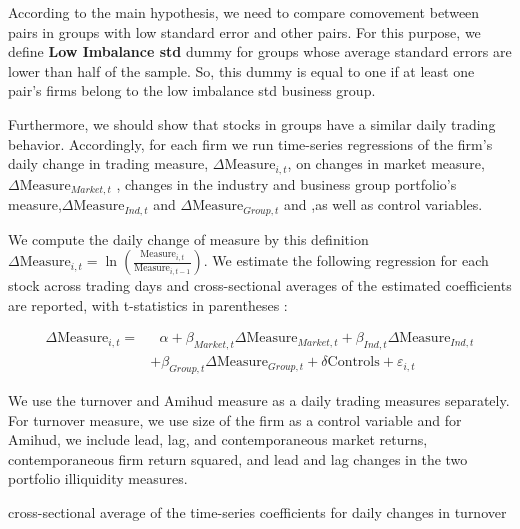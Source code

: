\documentclass[12pt, a4paper]{article}
\begin{document}
According to the main hypothesis, we need to compare comovement between pairs in groups with low standard error and other pairs.
For this purpose, we define \textbf{Low Imbalance std} dummy for groups whose average standard errors are lower than half of the sample. 
So, this dummy is equal to one if at least one pair's firms belong to the low imbalance std business group.
\begin{table}[htbp]
	\centering
	\resizebox{\textwidth}{!}{
		
	}
\end{table}
\FloatBarrier

Furthermore, we should show that stocks in groups have a similar daily trading behavior. Accordingly, for each firm we run time-series regressions of the firm's daily change in trading measure, $ \Delta \text{Measure}_{i,t} $, on changes in market measure,$ \Delta\text{Measure}_{Market,t}   $ , changes in the industry and business group portfolio's measure,$ \Delta\text{Measure}_{Ind,t} $ and  $\Delta \text{Measure}_{Group,t} $ and  ,as well as control variables.

We compute the daily change of measure by this definition $ \Delta \text{Measure}_{i,t} = \ln(\frac{\text{Measure}_{i,t}}{\text{Measure}_{i,t-1}}) $. 
We estimate the following regression for each stock across trading days and cross-sectional averages of the estimated coefficients are reported, with t-statistics in parentheses :

\begin{equation*}
	\begin{split}
		\Delta \text{Measure}_{i,t} =  & \text{	}\alpha + \beta_{Market,t} \Delta \text{Measure}_{Market,t}  
		+ \beta_{Ind,t} \Delta \text{Measure}_{Ind,t} \\ & + \beta_{Group,t} \Delta \text{Measure}_{Group,t} + \delta\text{Controls} + \varepsilon_{i,t}
	\end{split}
\end{equation*}

We use the turnover and Amihud measure as a daily trading measures separately. For turnover measure, we use size of the firm as a control variable and for Amihud, we include lead, lag, and contemporaneous market returns, contemporaneous firm return squared, and lead and lag changes in the two portfolio illiquidity measures.

\begin{table}[htbp]
	\centering
	\caption{cross-sectional average of the time-series coefficients for daily changes in turnover }
	\resizebox{0.6\textheight}{!}{
		
	}
\end{table}
\end{document}
